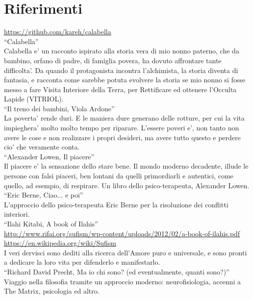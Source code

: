 \chapter{Riferimenti}
\label{chapRiferimenti}

  \url{https://github.com/kareh/calabella}\\
  ``Calabella''\\
  Calabella e' un racconto ispirato alla storia vera di mio nonno paterno, che da bambino, orfano di padre, di famiglia povera, ha dovuto affrontare tante difficolta'. Da quando il protagonista incontra l'alchimista, la storia diventa di fantasia, e racconta come sarebbe potuta evolvere la storia se mio nonno si fosse messo a fare Visita Interiore della Terra, per Rettificare ed ottenere l'Occulta Lapide (VITRIOL).\\

  ``Il treno dei bambini, Viola Ardone''\\
  La poverta' rende duri. E le maniera dure generano delle rotture, per cui la vita impieghera'
  molto molto tempo per riparare. L'essere poveri e', non tanto non avere le cose e non realizzare
  i propri desideri, ma avere tutto questo e perdere cio' che veramente conta.\\

  ``Alexander Lowen, Il piacere''\\
  Il piacere e' la sensazione dello stare bene. Il mondo moderno decadente, illude le persone
  con falsi piaceri, ben lontani da quelli primordiarli e autentici, come quello, ad esempio,
  di respirare. Un libro dello psico-terapeuta, Alexander Lowen.\\
  
  ``Eric Berne, Ciao... e poi''\\
  L'approccio dello psico-terapeuta Eric Berne per la risoluzione dei conflitti interiori.\\

  
  ``Ilahi Kitabi, A book of Ilahis''\\
  \url{http://www.rifai.org/sufism/wp-content/uploads/2012/02/a-book-of-ilahis.pdf}\\
  \url{https://en.wikipedia.org/wiki/Sufism}\\
  I veri dervisci sono dediti alla ricerca dell'Amore puro e universale, e sono pronti a
  dedicare la loro vita per difenderlo e manifestarlo.\\

  ``Richard David Precht, Ma io chi sono? (ed eventualmente, quanti sono?)''\\
  Viaggio nella filosofia tramite un approccio moderno: neurofisiologia, accenni a The Matrix, psicologia ed altro.
   
